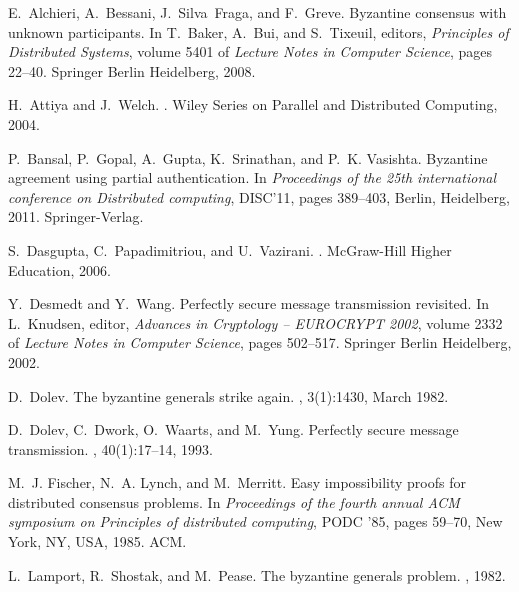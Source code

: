 \documentclass[letterpaper, 11pt]{article}
\begin{document}
\begin{thebibliography}{10}

E.~Alchieri, A.~Bessani, J.~Silva~Fraga, and F.~Greve.
\newblock Byzantine consensus with unknown participants.
\newblock In T.~Baker, A.~Bui, and S.~Tixeuil, editors, {\em Principles of
  Distributed Systems}, volume 5401 of {\em Lecture Notes in Computer Science},
  pages 22--40. Springer Berlin Heidelberg, 2008.

H.~Attiya and J.~Welch.
.
\newblock Wiley Series on Parallel and Distributed Computing, 2004.

P.~Bansal, P.~Gopal, A.~Gupta, K.~Srinathan, and P.~K. Vasishta.
\newblock Byzantine agreement using partial authentication.
\newblock In {\em Proceedings of the 25th international conference on
  Distributed computing}, DISC'11, pages 389--403, Berlin, Heidelberg, 2011.
  Springer-Verlag.

S.~Dasgupta, C.~Papadimitriou, and U.~Vazirani.
.
\newblock McGraw-Hill Higher Education, 2006.

Y.~Desmedt and Y.~Wang.
\newblock Perfectly secure message transmission revisited.
\newblock In L.~Knudsen, editor, {\em Advances in Cryptology -- EUROCRYPT
  2002}, volume 2332 of {\em Lecture Notes in Computer Science}, pages
  502--517. Springer Berlin Heidelberg, 2002.

D.~Dolev.
\newblock The byzantine generals strike again.
, 3(1):1430, March 1982.

D.~Dolev, C.~Dwork, O.~Waarts, and M.~Yung.
\newblock Perfectly secure message transmission.
,
  40(1):17--14, 1993.

M.~J. Fischer, N.~A. Lynch, and M.~Merritt.
\newblock Easy impossibility proofs for distributed consensus problems.
\newblock In {\em Proceedings of the fourth annual ACM symposium on Principles
  of distributed computing}, PODC '85, pages 59--70, New York, NY, USA, 1985.
  ACM.

L.~Lamport, R.~Shostak, and M.~Pease.
\newblock The byzantine generals problem.
, 1982.


\end{thebibliography}
\end{document}
